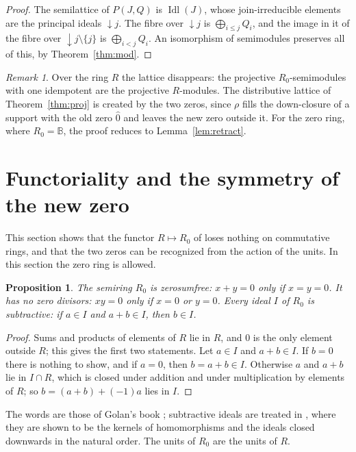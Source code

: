 \documentclass[11pt]{amsart}
\newtheorem{proposition}[thm]{Proposition}
\theoremstyle{remark}
\newtheorem{remark}[thm]{Remark}
\newcommand{\B}{\mathbb B}
\newcommand{\oz}{\widehat{0}}
\DeclareMathOperator{\Idl}{Idl}
\begin{document}
\begin{proof}
The semilattice of $P(J,Q)$ is $\Idl(J)$, whose join-irreducible elements are the principal ideals ${\downarrow}j$. The fibre over ${\downarrow}j$ is $\bigoplus_{i\le j}Q_i$, and the image in it of the fibre over ${\downarrow}j\setminus\{j\}$ is $\bigoplus_{i<j}Q_i$. An isomorphism of semimodules preserves all of this, by Theorem~\ref{thm:mod}.
\end{proof}

\begin{remark}
Over the ring $R$ the lattice disappears: the projective $R_0$-semimodules with one idempotent are the projective $R$-modules. The distributive lattice of Theorem~\ref{thm:proj} is created by the two zeros, since $\rho$ fills the down-closure of a support with the old zero $\oz$ and leaves the new zero outside it. For the zero ring, where $R_0=\B$, the proof reduces to Lemma~\ref{lem:retract}.
\end{remark}

\section{Functoriality and the symmetry of the new zero}\label{sec:sym}

This section shows that the functor $R\mapsto R_0$ of \cite{FGJM} loses nothing on commutative rings, and that the two zeros can be recognized from the action of the units. In this section the zero ring is allowed.

\begin{proposition}\label{prop:golan}
The semiring $R_0$ is zerosumfree: $x+y=0$ only if $x=y=0$. It has no zero divisors: $xy=0$ only if $x=0$ or $y=0$. Every ideal $I$ of $R_0$ is subtractive: if $a\in I$ and $a+b\in I$, then $b\in I$.
\end{proposition}

\begin{proof}
Sums and products of elements of $R$ lie in $R$, and $0$ is the only element outside $R$; this gives the first two statements. Let $a\in I$ and $a+b\in I$. If $b=0$ there is nothing to show, and if $a=0$, then $b=a+b\in I$. Otherwise $a$ and $a+b$ lie in $I\cap R$, which is closed under addition and under multiplication by elements of $R$; so $b=(a+b)+(-1)a$ lies in $I$.
\end{proof}

The words are those of Golan's book \cite{Golan}; subtractive ideals are treated in \cite[\S6.1]{FGJM}, where they are shown to be the kernels of homomorphisms and the ideals closed downwards in the natural order. The units of $R_0$ are the units of $R$.
\end{document}

